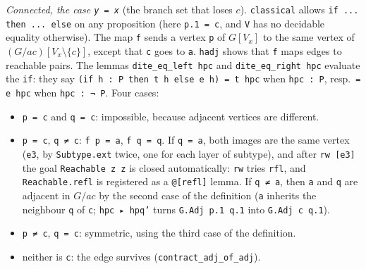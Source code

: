 \documentclass[11pt,a4paper]{article}
\newcommand{\lean}[1]{\texttt{\textcolor{leanink}{#1}}}
\newcommand{\how}{\par\smallskip{\sffamily\bfseries\color{accent}Proof, step by step.}\enspace}
\begin{document}
\how \emph{Connected, the case \lean{y = x}} (the branch set that loses $c$).
\lean{classical} allows \lean{if ... then ... else} on any proposition (here \lean{p.1 = c}, and
\lean{V} has no decidable equality otherwise). The map \lean{f} sends a vertex \lean{p} of $G[V_x]$
to the same vertex of $(G / ac)[V_x \setminus \{c\}]$, except that \lean{c} goes to \lean{a}.
\lean{hadj} shows that \lean{f} maps edges to reachable pairs. The lemmas
\lean{dite\_\allowbreak{}eq\_\allowbreak{}left hpc} and \lean{dite\_\allowbreak{}eq\_\allowbreak{}right hpc} evaluate the \lean{if}: they say
\lean{(if h : P then t h else e h) = t hpc} when \lean{hpc : P}, resp.\ \lean{= e hpc} when
\lean{hpc : ¬ P}. Four cases:
\begin{itemize}
\item \lean{p = c} and \lean{q = c}: impossible, because adjacent vertices are different.
\item \lean{p = c}, \lean{q ≠ c}: \lean{f p = a}, \lean{f q = q}. If \lean{q = a}, both images are the
  same vertex (\lean{e3}, by \lean{Subtype.ext} twice, one for each layer of subtype), and after
  \lean{rw [e3]} the goal \lean{Reachable z z} is closed automatically: \lean{rw} tries \lean{rfl},
  and \lean{Reachable.refl} is registered as a \lean{@[refl]} lemma. If \lean{q ≠ a}, then \lean{a} and
  \lean{q} are adjacent in $G / ac$ by the second case of the definition (\lean{a} inherits the
  neighbour \lean{q} of \lean{c}; \lean{hpc ▸ hpq'} turns \lean{G.Adj p.1 q.1} into \lean{G.Adj c q.1}).
\item \lean{p ≠ c}, \lean{q = c}: symmetric, using the third case of the definition.
\item neither is \lean{c}: the edge survives (\lean{contract\_\allowbreak{}adj\_\allowbreak{}of\_\allowbreak{}adj}).
\end{itemize}
\end{document}
